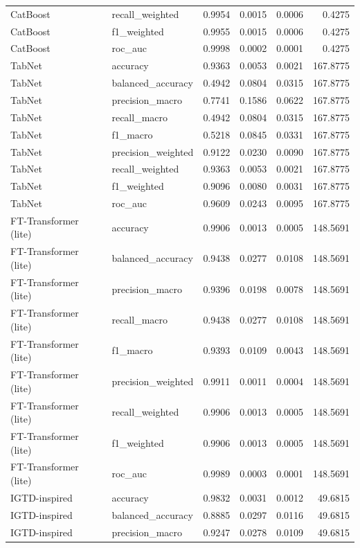 \begin{tabular}{llrrrr}
CatBoost & recall_weighted & 0.9954 & 0.0015 & 0.0006 & 0.4275 \\
CatBoost & f1_weighted & 0.9955 & 0.0015 & 0.0006 & 0.4275 \\
CatBoost & roc_auc & 0.9998 & 0.0002 & 0.0001 & 0.4275 \\
TabNet & accuracy & 0.9363 & 0.0053 & 0.0021 & 167.8775 \\
TabNet & balanced_accuracy & 0.4942 & 0.0804 & 0.0315 & 167.8775 \\
TabNet & precision_macro & 0.7741 & 0.1586 & 0.0622 & 167.8775 \\
TabNet & recall_macro & 0.4942 & 0.0804 & 0.0315 & 167.8775 \\
TabNet & f1_macro & 0.5218 & 0.0845 & 0.0331 & 167.8775 \\
TabNet & precision_weighted & 0.9122 & 0.0230 & 0.0090 & 167.8775 \\
TabNet & recall_weighted & 0.9363 & 0.0053 & 0.0021 & 167.8775 \\
TabNet & f1_weighted & 0.9096 & 0.0080 & 0.0031 & 167.8775 \\
TabNet & roc_auc & 0.9609 & 0.0243 & 0.0095 & 167.8775 \\
FT-Transformer (lite) & accuracy & 0.9906 & 0.0013 & 0.0005 & 148.5691 \\
FT-Transformer (lite) & balanced_accuracy & 0.9438 & 0.0277 & 0.0108 & 148.5691 \\
FT-Transformer (lite) & precision_macro & 0.9396 & 0.0198 & 0.0078 & 148.5691 \\
FT-Transformer (lite) & recall_macro & 0.9438 & 0.0277 & 0.0108 & 148.5691 \\
FT-Transformer (lite) & f1_macro & 0.9393 & 0.0109 & 0.0043 & 148.5691 \\
FT-Transformer (lite) & precision_weighted & 0.9911 & 0.0011 & 0.0004 & 148.5691 \\
FT-Transformer (lite) & recall_weighted & 0.9906 & 0.0013 & 0.0005 & 148.5691 \\
FT-Transformer (lite) & f1_weighted & 0.9906 & 0.0013 & 0.0005 & 148.5691 \\
FT-Transformer (lite) & roc_auc & 0.9989 & 0.0003 & 0.0001 & 148.5691 \\
IGTD-inspired & accuracy & 0.9832 & 0.0031 & 0.0012 & 49.6815 \\
IGTD-inspired & balanced_accuracy & 0.8885 & 0.0297 & 0.0116 & 49.6815 \\
IGTD-inspired & precision_macro & 0.9247 & 0.0278 & 0.0109 & 49.6815 \\

\end{tabular}
